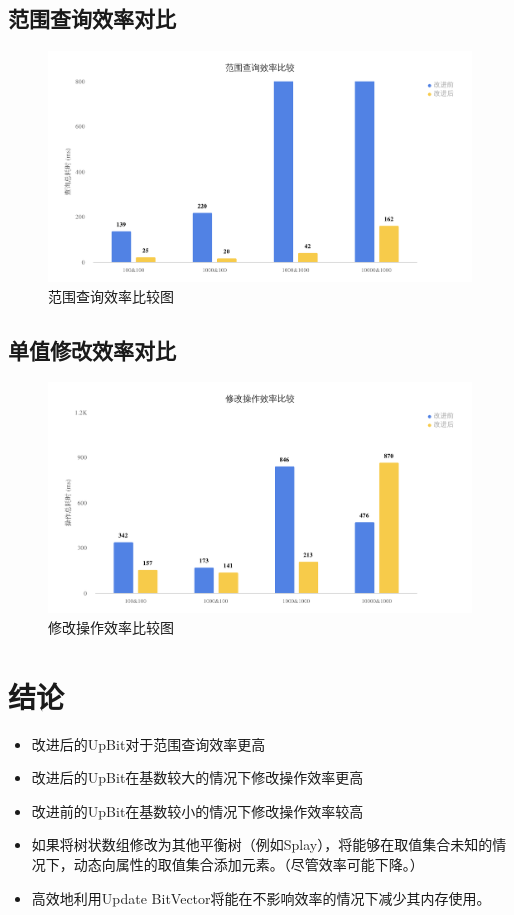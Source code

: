 \documentclass[11pt, a4paper]{article}
\begin{document}
\subsection{范围查询效率对比}
\begin{figure}[H]
  \begin{center}
    \includegraphics[width=6.5in]{query.png}
    \caption{范围查询效率比较图}\label{fig:query}
  \end{center}
\end{figure}
\subsection{单值修改效率对比}
\begin{figure}[H]
  \begin{center}
    \includegraphics[width=6.5in]{update.png}
    \caption{修改操作效率比较图}\label{fig:update}
  \end{center}
\end{figure}

\section{结论}

\begin{itemize}
\item 改进后的UpBit对于范围查询效率更高
\item 改进后的UpBit在基数较大的情况下修改操作效率更高
\item 改进前的UpBit在基数较小的情况下修改操作效率较高
\item 如果将树状数组修改为其他平衡树（例如Splay），将能够在取值集合未知的情况下，动态向属性的取值集合添加元素。（尽管效率可能下降。）
\item 高效地利用Update BitVector将能在不影响效率的情况下减少其内存使用。
\end{itemize}
\end{document}
